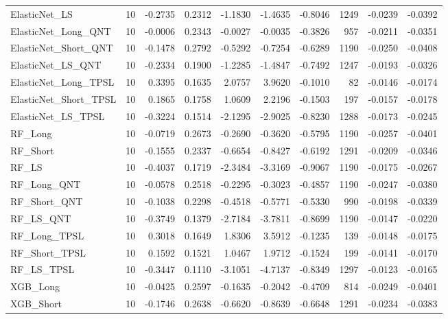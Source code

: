 \begin{tabular}{llrrrrrrrr}
\cline{1-10}
ElasticNet\_LS & 10 & -0.2735 & 0.2312 & -1.1830 & -1.4635 & -0.8046 & 1249 & -0.0239 & -0.0392 \\
\cline{1-10}
ElasticNet\_Long\_QNT & 10 & -0.0006 & 0.2343 & -0.0027 & -0.0035 & -0.3826 & 957 & -0.0211 & -0.0351 \\
\cline{1-10}
ElasticNet\_Short\_QNT & 10 & -0.1478 & 0.2792 & -0.5292 & -0.7254 & -0.6289 & 1190 & -0.0250 & -0.0408 \\
\cline{1-10}
ElasticNet\_LS\_QNT & 10 & -0.2334 & 0.1900 & -1.2285 & -1.4847 & -0.7492 & 1247 & -0.0193 & -0.0326 \\
\cline{1-10}
ElasticNet\_Long\_TPSL & 10 & 0.3395 & 0.1635 & 2.0757 & 3.9620 & -0.1010 & 82 & -0.0146 & -0.0174 \\
\cline{1-10}
ElasticNet\_Short\_TPSL & 10 & 0.1865 & 0.1758 & 1.0609 & 2.2196 & -0.1503 & 197 & -0.0157 & -0.0178 \\
\cline{1-10}
ElasticNet\_LS\_TPSL & 10 & -0.3224 & 0.1514 & -2.1295 & -2.9025 & -0.8230 & 1288 & -0.0173 & -0.0245 \\
\cline{1-10}
RF\_Long & 10 & -0.0719 & 0.2673 & -0.2690 & -0.3620 & -0.5795 & 1190 & -0.0257 & -0.0401 \\
\cline{1-10}
RF\_Short & 10 & -0.1555 & 0.2337 & -0.6654 & -0.8427 & -0.6192 & 1291 & -0.0209 & -0.0346 \\
\cline{1-10}
RF\_LS & 10 & -0.4037 & 0.1719 & -2.3484 & -3.3169 & -0.9067 & 1190 & -0.0175 & -0.0267 \\
\cline{1-10}
RF\_Long\_QNT & 10 & -0.0578 & 0.2518 & -0.2295 & -0.3023 & -0.4857 & 1190 & -0.0247 & -0.0380 \\
\cline{1-10}
RF\_Short\_QNT & 10 & -0.1038 & 0.2298 & -0.4518 & -0.5771 & -0.5330 & 990 & -0.0198 & -0.0339 \\
\cline{1-10}
RF\_LS\_QNT & 10 & -0.3749 & 0.1379 & -2.7184 & -3.7811 & -0.8699 & 1190 & -0.0147 & -0.0220 \\
\cline{1-10}
RF\_Long\_TPSL & 10 & 0.3018 & 0.1649 & 1.8306 & 3.5912 & -0.1235 & 139 & -0.0148 & -0.0175 \\
\cline{1-10}
RF\_Short\_TPSL & 10 & 0.1592 & 0.1521 & 1.0467 & 1.9712 & -0.1524 & 199 & -0.0141 & -0.0170 \\
\cline{1-10}
RF\_LS\_TPSL & 10 & -0.3447 & 0.1110 & -3.1051 & -4.7137 & -0.8349 & 1297 & -0.0123 & -0.0165 \\
\cline{1-10}
XGB\_Long & 10 & -0.0425 & 0.2597 & -0.1635 & -0.2042 & -0.4709 & 814 & -0.0249 & -0.0401 \\
\cline{1-10}
XGB\_Short & 10 & -0.1746 & 0.2638 & -0.6620 & -0.8639 & -0.6648 & 1291 & -0.0234 & -0.0383 \\

\end{tabular}
